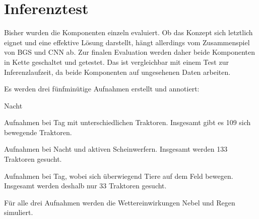 






\section{Inferenztest} \label{ch6:inference}
Bisher wurden die Komponenten einzeln evaluiert.
Ob das Konzept sich letztlich eignet und eine effektive Lösung darstellt, hängt allerdings vom Zusammenspiel von \ac{BGS} und \ac{CNN} ab.
Zur finalen Evaluation werden daher beide Komponenten in Kette geschaltet und getestet.
Das ist vergleichbar mit einem Test zur Inferenzlaufzeit, da beide Komponenten auf ungesehenen Daten arbeiten.

\bigskip
Es werden drei fünfminütige Aufnahmen erstellt und annotiert:
\begin{labeling}{Nacht \quad}
    \item [\BF{Tag}]
        Aufnahmen bei Tag mit unterschiedlichen Traktoren.
        Insgesamt gibt es 109 sich bewegende Traktoren.
    \item [\BF{Nacht}]
        Aufnahmen bei Nacht und aktiven Scheinwerfern.
        Insgesamt werden 133 Traktoren gesucht.
    \item [\BF{Tiere}] 
        Aufnahmen bei Tag, wobei sich überwiegend Tiere auf dem Feld bewegen.
        Insgesamt werden deshalb nur 33 Traktoren gesucht.
\end{labeling}
Für alle drei Aufnahmen werden die Wettereinwirkungen Nebel und Regen simuliert.

